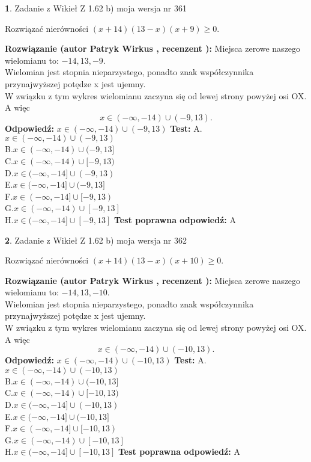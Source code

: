 \documentclass[12pt, a4paper]{article}
\theoremstyle{definition} %
\newtheorem{zad}{}
\newcommand{\zadStart}[1]{\begin{zad}#1\newline}
\newcommand{\zadStop}{\end{zad}}
\newcommand{\rozwStart}[2]{\noindent \textbf{Rozwiązanie (autor #1 , recenzent #2): }\newline}
\newcommand{\rozwStop}{\newline}
\newcommand{\odpStart}{\noindent \textbf{Odpowiedź:}\newline}
\newcommand{\odpStop}{\newline}
\newcommand{\testStart}{\noindent \textbf{Test:}\newline}
\newcommand{\testStop}{\newline}
\newcommand{\kluczStart}{\noindent \textbf{Test poprawna odpowiedź:}\newline}
\newcommand{\kluczStop}{\newline}
\begin{document}
\zadStart{Zadanie z Wikieł Z 1.62 b) moja wersja nr 361}

Rozwiązać nierówności $(x+14)(13-x)(x+9)\ge0$.
\zadStop
\rozwStart{Patryk Wirkus}{}
Miejsca zerowe naszego wielomianu to: $-14, 13, -9$.\\
Wielomian jest stopnia nieparzystego, ponadto znak współczynnika przy\linebreak najwyższej potędze x jest ujemny.\\ W związku z tym wykres wielomianu zaczyna się od lewej strony powyżej osi OX. A więc $$x \in (-\infty,-14) \cup (-9,13).$$
\rozwStop
\odpStart
$x \in (-\infty,-14) \cup (-9,13)$
\odpStop
\testStart
A.$x \in (-\infty,-14) \cup (-9,13)$\\
B.$x \in (-\infty,-14) \cup (-9,13]$\\
C.$x \in (-\infty,-14) \cup [-9,13)$\\
D.$x \in (-\infty,-14] \cup (-9,13)$\\
E.$x \in (-\infty,-14] \cup (-9,13]$\\
F.$x \in (-\infty,-14] \cup [-9,13)$\\
G.$x \in (-\infty,-14) \cup [-9,13]$\\
H.$x \in (-\infty,-14] \cup [-9,13]$
\testStop
\kluczStart
A
\kluczStop



\zadStart{Zadanie z Wikieł Z 1.62 b) moja wersja nr 362}

Rozwiązać nierówności $(x+14)(13-x)(x+10)\ge0$.
\zadStop
\rozwStart{Patryk Wirkus}{}
Miejsca zerowe naszego wielomianu to: $-14, 13, -10$.\\
Wielomian jest stopnia nieparzystego, ponadto znak współczynnika przy\linebreak najwyższej potędze x jest ujemny.\\ W związku z tym wykres wielomianu zaczyna się od lewej strony powyżej osi OX. A więc $$x \in (-\infty,-14) \cup (-10,13).$$
\rozwStop
\odpStart
$x \in (-\infty,-14) \cup (-10,13)$
\odpStop
\testStart
A.$x \in (-\infty,-14) \cup (-10,13)$\\
B.$x \in (-\infty,-14) \cup (-10,13]$\\
C.$x \in (-\infty,-14) \cup [-10,13)$\\
D.$x \in (-\infty,-14] \cup (-10,13)$\\
E.$x \in (-\infty,-14] \cup (-10,13]$\\
F.$x \in (-\infty,-14] \cup [-10,13)$\\
G.$x \in (-\infty,-14) \cup [-10,13]$\\
H.$x \in (-\infty,-14] \cup [-10,13]$
\testStop
\kluczStart
A
\kluczStop
\end{document}
